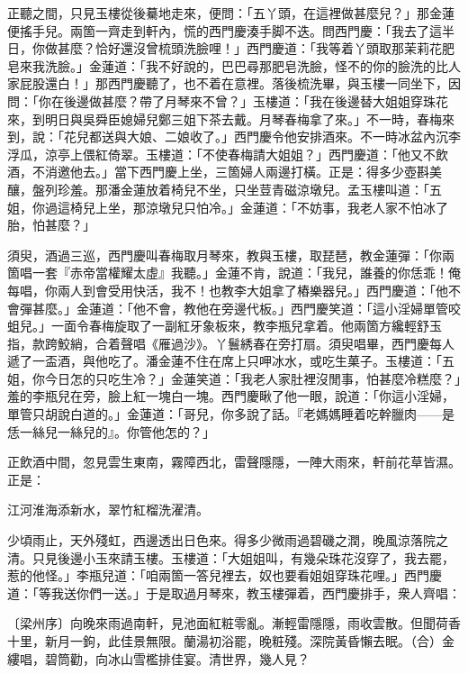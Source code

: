正聽之間，只見玉樓從後驀地走來，便問：「五丫頭，在這裡做甚麼兒？」那金蓮便搖手兒。{}兩箇一齊走到軒內，慌的西門慶湊手脚不迭。問西門慶：「我去了這半日，你做甚麼？恰好還沒曾梳頭洗臉哩！」西門慶道：「我等着丫頭取那茉莉花肥皂來我洗臉。」金蓮道：「我不好說的，巴巴尋那肥皂洗臉，怪不的你的臉洗的比人家屁股還白！」{}那西門慶聽了，也不着在意裡。落後梳洗畢，與玉樓一同坐下，因問：「你在後邊做甚麼？帶了月琴來不曾？」玉樓道：「我在後邊替大姐姐穿珠花來，到明日與吳舜臣媳婦兒鄭三姐下茶去戴。月琴春梅拿了來。」不一時，春梅來到，說：「花兒都送與大娘、二娘收了。」西門慶令他安排酒來。不一時冰盆內沉李浮瓜，涼亭上偎紅倚翠。玉樓道：「不使春梅請大姐姐？」西門慶道：「他又不飲酒，不消邀他去。」當下西門慶上坐，三箇婦人兩邊打橫。正是：得多少壺斟美釀，盤列珍羞。那潘金蓮放着椅兒不坐，只坐荳青磁涼墩兒。孟玉樓叫道：「五姐，你過這椅兒上坐，那涼墩兒只怕冷。」金蓮道：「不妨事，我老人家不怕冰了胎，怕甚麼？」{}

須臾，酒過三巡，西門慶叫春梅取月琴來，教與玉樓，取琵琶，教金蓮彈：「你兩箇唱一套『赤帝當權耀太虛』我聽。」金蓮不肯，說道：「我兒，誰養的你恁乖！俺每唱，你兩人到會受用快活，我不！也教李大姐拿了樁樂器兒。」{}西門慶道：「他不會彈甚麼。」金蓮道：「他不會，教他在旁邊代板。」西門慶笑道：「這小淫婦單管咬蛆兒。」一面令春梅旋取了一副紅牙象板來，教李瓶兒拿着。他兩箇方纔輕舒玉指，款跨鮫綃，合着聲唱《雁過沙》。丫鬟綉春在旁打扇。須臾唱畢，西門慶每人遞了一盃酒，與他吃了。潘金蓮不住在席上只呷冰水，或吃生菓子。玉樓道：「五姐，你今日怎的只吃生冷？」金蓮笑道：「我老人家肚裡沒閒事，怕甚麼冷糕麼？」{}羞的李瓶兒在旁，臉上紅一塊白一塊。西門慶瞅了他一眼，說道：「你這小淫婦，單管只胡說白道的。」金蓮道：「哥兒，你多說了話。『老媽媽睡着吃幹臘肉——是恁一絲兒一絲兒的』。你管他怎的？」

正飲酒中間，忽見雲生東南，霧障西北，雷聲隱隱，一陣大雨來，軒前花草皆濕。正是：

\begin{myquote} 
江河淮海添新水，翠竹紅榴洗濯清。
\end{myquote} 

少頃雨止，天外殘虹，西邊透出日色來。得多少微雨過碧磯之潤，晚風涼落院之清。只見後邊小玉來請玉樓。玉樓道：「大姐姐叫，有幾朵珠花沒穿了，我去罷，惹的他怪。」李瓶兒道：「咱兩箇一答兒裡去，奴也要看姐姐穿珠花哩。」西門慶道：「等我送你們一送。」于是取過月琴來，教玉樓彈着，西門慶排手，衆人齊唱：

\begin{myquote} 
{\markfont\small{〔梁州序〕}}向晚來雨過南軒，見池面紅粧零亂。漸輕雷隱隱，雨收雲散。但聞荷香十里，新月一鉤，此佳景無限。蘭湯初浴罷，晚粧殘。深院黃昏懶去眠。{\markfont\small{（合）}}金縷唱，碧筒勸，向冰山雪檻排佳宴。清世界，幾人見？
\end{myquote} 

